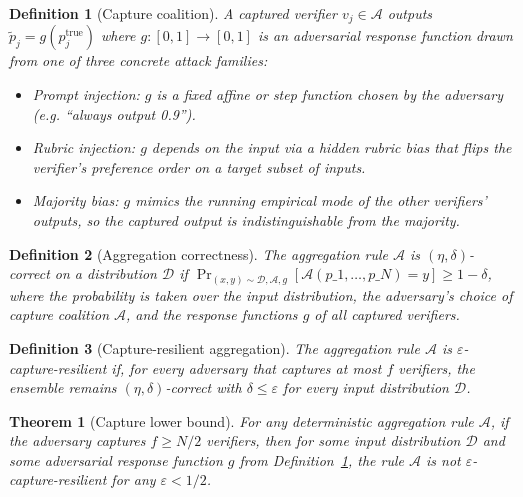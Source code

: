 \documentclass[11pt]{article}
\newtheorem{definition}{Definition}
\newtheorem{theorem}{Theorem}
\newcommand{\A}{\mathcal{A}}            %
\begin{document}
\begin{definition}[Capture coalition]
\label{def:capture}
A captured verifier $v_j \in \A$ outputs
$\tilde{p}_j = g(p_j^{\text{true}})$ where $g: [0,1] \to [0,1]$ is an
adversarial response function drawn from one of three concrete attack
families:
\begin{itemize}
  \item \emph{Prompt injection}: $g$ is a fixed affine or step function
        chosen by the adversary (e.g. ``always output 0.9'').
  \item \emph{Rubric injection}: $g$ depends on the input via a hidden
        rubric bias that flips the verifier's preference order on a
        target subset of inputs.
  \item \emph{Majority bias}: $g$ mimics the running empirical mode of
        the other verifiers' outputs, so the captured output is
        indistinguishable from the majority.
\end{itemize}
\end{definition}

\begin{definition}[Aggregation correctness]
\label{def:correctness}
The aggregation rule $\mathcal{A}$ is $(\eta, \delta)$-correct on a
distribution $\mathcal{D}$ if
$\Pr_{(x,y) \sim \mathcal{D}, \A, g}
[\mathcal{A}(p\_1, \ldots, p\_N) = y] \geq 1 - \delta$,
where the probability is taken over the input distribution, the
adversary's choice of capture coalition $\A$, and the response
functions $g$ of all captured verifiers.
\end{definition}

\begin{definition}[Capture-resilient aggregation]
\label{def:resilient}
The aggregation rule $\mathcal{A}$ is $\varepsilon$-\emph{capture-resilient}
if, for every adversary that captures at most $f$ verifiers, the ensemble
remains $(\eta, \delta)$-correct with $\delta \leq \varepsilon$ for every
input distribution $\mathcal{D}$.
\end{definition}

\begin{theorem}[Capture lower bound]
\label{thm:lower}
For any deterministic aggregation rule $\mathcal{A}$, if the adversary
captures $f \geq N/2$ verifiers, then for \emph{some} input distribution
$\mathcal{D}$ and \emph{some} adversarial response function $g$ from
Definition~\ref{def:capture}, the rule $\mathcal{A}$ is not
$\varepsilon$-capture-resilient for any $\varepsilon < 1/2$.
\end{theorem}
\end{document}
